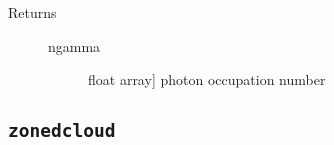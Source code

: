 \documentclass[letterpaper,10pt,english]{sphinxmanual}
\begin{document}
\begin{fulllineitems}
\begin{fulllineitems}
\begin{description}
\begin{description}
\end{description}

\item[{Returns}] \leavevmode\begin{description}
\item[{ngamma}] \leavevmode{[}float \textbar{} array{]}
photon occupation number

\end{description}

\end{description}

\end{fulllineitems}


\end{fulllineitems}



\subsection{\texttt{zonedcloud}}
\label{fulldoc:sssec-full-zonedcloud}\label{fulldoc:zonedcloud}
\end{document}
